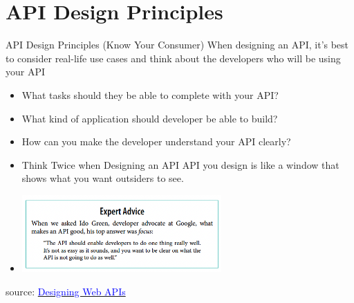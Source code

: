 \documentclass{beamer}
\begin{document}
\section{API Design Principles}
\begin{frame}{API Design Principles (Know Your Consumer)}
		\scriptsize
  When designing an API, it's best to consider real-life use cases and think about the developers who will be using your API
  \begin{itemize}
  
    \item<1-> What tasks should they be able to complete with your API? 
    \item<2-> What kind of application should developer be able to build?
    \item<3-> How can you make the developer understand your API clearly?
    \item<4->[] 
    	\begin{block}{Think Twice when Designing an API}
			 API you design is like a window that shows what you want outsiders to see.
		\end{block}
	\item<5->[]
		\begin{center}
   			\includegraphics[width=0.6\textwidth, height=0.4\textheight]{img/advice-API.png}
	    \end{center}
    
  \end{itemize}
  
  \tiny { source: \href{https://www.oreilly.com/library/view/designing-web-apis/9781492026914/}{\textcolor{blue}{Designing Web APIs}}}
\end{frame}
\end{document}
